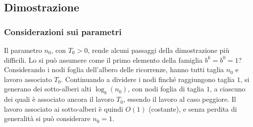 \subsection{Dimostrazione}
\subsubsection{Considerazioni sui parametri}
Il parametro $n_0$, con $T_0>0$, rende alcuni passaggi della dimostrazione più difficili. Lo si può assumere come il primo elemento della famiglia $b^k=b^0=1$? Considerando i nodi foglia dell'albero delle ricorrenze, hanno tutti taglia $n_0$ e lavoro associato $T_0$. Continuando a dividere i nodi finché raggiungono taglia $1$, si generano dei sotto-alberi alti $\log_b \left( n_0 \right)$, con nodi foglia di taglia $1$, a ciascuno dei quali è associato ancora il lavoro $T_0$, essendo il lavoro al caso peggiore. Il lavoro associato ai sotto-alberi è quindi $O(1)$ (costante), e senza perdita di generalità si può considerare $n_0=1$.

